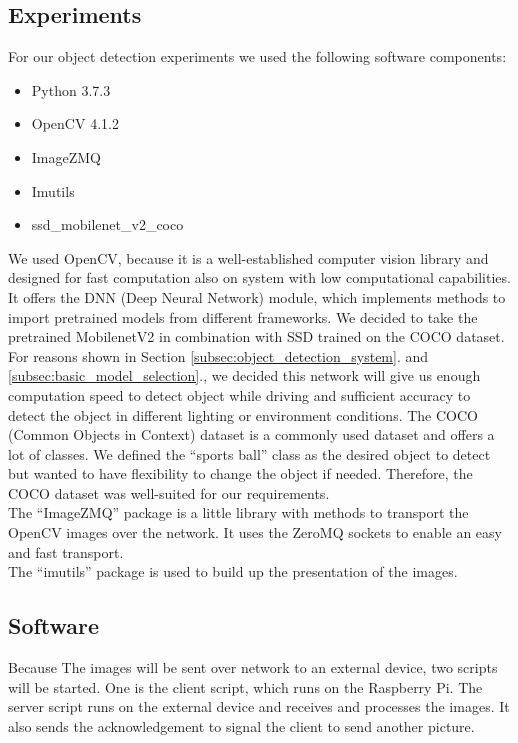 \subsection{Experiments}

For our object detection experiments we used the following software components:

\begin{itemize}
\itemsep0em
\item Python 3.7.3
\item OpenCV 4.1.2 \cite{tim6}
\item ImageZMQ \cite{tim7}
\item Imutils \cite{tim8}
\item ssd\_mobilenet\_v2\_coco \cite{tim9}
\end{itemize}

We used OpenCV, because it is a well-established computer vision library and designed for fast computation also on system with low computational capabilities. It offers the DNN (Deep Neural Network) module, which implements methods to import pretrained models from different frameworks. We decided to take the pretrained MobilenetV2 in combination with SSD trained on the COCO dataset. For reasons shown in Section \ref{subsec:object_detection_system}. and \ref{subsec:basic_model_selection}., we decided this network will give us enough computation speed to detect object while driving and sufficient accuracy to detect the object in different lighting or environment conditions. The COCO (Common Objects in Context) dataset is a commonly used dataset and offers a lot of classes. We defined the ``sports ball'' class as the desired object to detect but wanted to have flexibility to change the object if needed. Therefore, the COCO dataset was well-suited for our requirements.\\

The ``ImageZMQ'' package is a little library with methods to transport the OpenCV images over the network. It uses the ZeroMQ sockets to enable an easy and fast transport.\\

The ``imutils'' package is used to build up the presentation of the images.

\subsection{Software}

Because The images will be sent over network to an external device, two scripts will be started. One is the client script, which runs on the Raspberry Pi. The server script runs on the external device and receives and processes the images. It also sends the acknowledgement to signal the client to send another picture.

